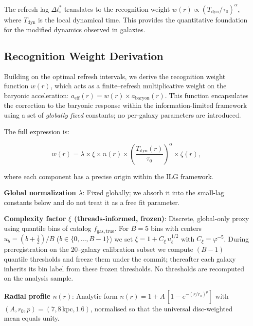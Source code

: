 \documentclass[usenatbib]{mnras}
\begin{document}
The refresh lag $\Delta t_i^*$ translates to the recognition weight $w(r) \propto (T_\mathrm{dyn}/\tau_0)^\alpha$, where $T_\mathrm{dyn}$ is the local dynamical time. This provides the quantitative foundation for the modified dynamics observed in galaxies.

\subsection{Recognition Weight Derivation}

Building on the optimal refresh intervals, we derive the recognition weight function $w(r)$, which acts as a finite–refresh multiplicative weight on the baryonic acceleration: $a_\mathrm{eff}(r) = w(r) \times a_\mathrm{baryon}(r)$. This function encapsulates the correction to the baryonic response within the information-limited framework using a set of \emph{globally fixed} constants; no per-galaxy parameters are introduced.

The full expression is:

\begin{equation}
w(r) = \lambda \times \xi \times n(r) \times \left(\frac{T_\mathrm{dyn}(r)}{\tau_0}\right)^\alpha \times \zeta(r),
\end{equation}

where each component has a precise origin within the ILG framework.

\textbf{Global normalization $\lambda$}: Fixed globally; we absorb it into the small-lag constants below and do not treat it as a free fit parameter.

\textbf{Complexity factor $\xi$ (threads-informed, frozen)}: Discrete, global-only proxy using quantile bins of catalog $f_\mathrm{gas,true}$. For $B=5$ bins with centers $u_b=(b+\tfrac{1}{2})/B$ ($b\in\{0,\dots,B{-}1\}$) we set $\xi = 1 + C_\xi\,u_b^{1/2}$ with $C_\xi = \varphi^{-5}$. During preregistration on the 20–galaxy calibration subset we compute $(B{-}1)$ quantile thresholds and freeze them under the commit; thereafter each galaxy inherits its bin label from these frozen thresholds. No thresholds are recomputed on the analysis sample.

\textbf{Radial profile $n(r)$}: Analytic form $n(r) = 1 + A\,[1 - e^{-(r/r_0)^p}]$ with $(A, r_0, p) = (7, 8\,\mathrm{kpc}, 1.6)$, normalised so that the universal disc-weighted mean equals unity.
\end{document}
